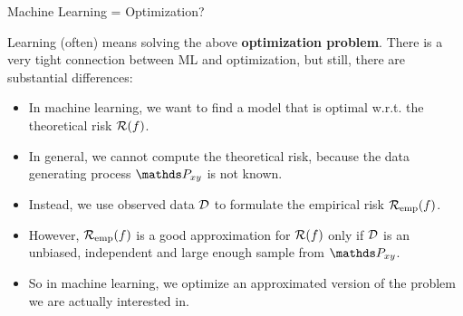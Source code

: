 \begin{vbframe}{Machine Learning = Optimization?}

Learning (often) means solving the above \textbf{optimization problem}.
There is a very tight connection between ML and optimization, but still, there are substantial differences:

\begin{itemize}
  \item In machine learning, we want to find a model that is optimal w.r.t. the theoretical risk $\mathcal{R}(f)$.
  \item In general, we cannot compute the theoretical risk, because the data generating process $\Pxy$ is not known.
  \item Instead, we use observed data $\mathcal{D}$ to formulate the empirical risk $\mathcal{R}_{\text{emp}}(f)$.
  \item However, $\mathcal{R}_{\text{emp}}(f)$ is a good approximation for $\mathcal{R}(f)$ only if $\mathcal{D}$ is an unbiased, independent and large enough sample from $\Pxy$.
  \item So in machine learning, we optimize an approximated version of the problem we are actually interested in.
\end{itemize}

\end{vbframe}


